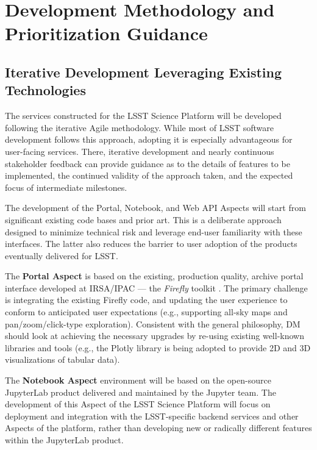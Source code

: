 \section{Development Methodology and Prioritization Guidance\label{sec:methdology}}

\subsection{Iterative Development Leveraging Existing Technologies }

The services constructed for the LSST Science Platform will be developed following the iterative Agile methodology. While most of LSST software development follows this approach, adopting it is especially advantageous for user-facing services. There, iterative development and nearly continuous stakeholder feedback can provide guidance as to the details of features to be implemented, the continued validity of the approach taken, and the expected focus of intermediate milestones.

The development of the Portal, Notebook, and Web API Aspects will start from significant existing code bases and prior art.
This is a deliberate approach designed to minimize technical risk and leverage end-user familiarity with these interfaces.
The latter also reduces the barrier to user adoption of the products eventually delivered for LSST.

The \textbf{Portal Aspect} is based on the existing, production quality, archive portal interface developed at IRSA/IPAC --- the \emph{Firefly} toolkit \citep{2016SPIE.9913E..0YR}.
The primary challenge is integrating the existing Firefly code, and updating the user experience to conform to anticipated user expectations (e.g., supporting all-sky maps and pan/zoom/click-type exploration).
Consistent with the general philosophy, DM should look at achieving the necessary upgrades by re-using existing well-known libraries and tools (e.g., the Plotly library is being adopted to provide 2D and 3D visualizations of tabular data).

The \textbf{Notebook Aspect} environment will be based on the open-source JupyterLab product delivered and maintained by the Jupyter team.
The development of this Aspect of the LSST Science Platform will focus on deployment and integration with the LSST-specific backend services and other Aspects of the platform, rather than developing new or radically different features within the JupyterLab product.


